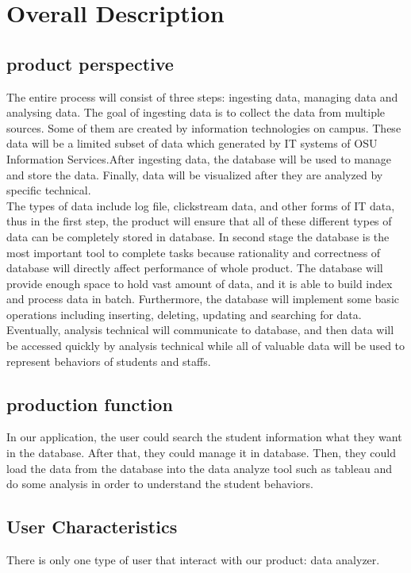 \documentclass[letterpaper,10pt]{article}
\begin{document}
    \section{Overall Description}
        \subsection{product perspective}
        The entire process will consist of three steps: ingesting data, managing data and analysing data. The goal of ingesting data is to collect the data from multiple sources. Some of them are created by information technologies on campus. These data will be a limited subset of data which generated by IT systems of OSU Information Services.After ingesting data, the database will be used to manage and store the data. Finally, data will be visualized after they are analyzed by specific technical.\\

        \noindent The types of data include log file, clickstream data, and other forms of IT data, thus in the first step, the product will ensure that all of these different types of data can be completely stored in database. In second stage the database is the most important tool to complete tasks because rationality and correctness of database will directly affect performance of whole product. The database will provide enough space to hold vast amount of data, and it is able to build index and process data in batch. Furthermore, the database will implement some basic operations including inserting, deleting, updating and searching for data. Eventually, analysis technical will communicate to database, and then data will be accessed quickly by analysis technical while all of valuable data will be used to represent behaviors of students and staffs.

        \subsection{production function}
        In our application, the user could search the student information what they want in the database. After that, they could manage it in database. Then, they could load the data from the database into the data analyze tool such as tableau and do some analysis in order to understand the student behaviors. 

        \subsection{User Characteristics}
        There is only one type of user that interact with our product: data analyzer.
\end{document}

